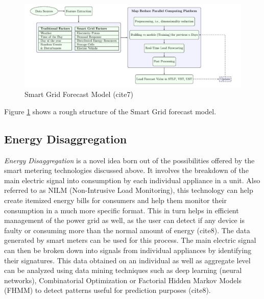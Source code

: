 \begin{figure}
	\includegraphics[width=\columnwidth]{images/sg_forecast.pdf}
	\caption{Smart Grid Forecast Model (cite7)}
	\label{F:forecast}
\end{figure}
Figure \ref{F:forecast} shows a rough structure of the Smart Grid forecast model.

\subsection{Energy Disaggregation}
{\em Energy Disaggregation} is a novel idea born out of the possibilities offered by the smart metering technologies discussed above. It involves the breakdown of the main electric signal into consumption by each individual appliance in a unit. Also referred to as NILM (Non-Intrusive Load Monitoring), this technology can help create itemized energy bills for consumers and help them monitor their consumption in a much more specific format. This in turn helps in efficient management of the power grid as well, as the user can detect if any device is faulty or consuming more than the normal amount of energy (cite8). The data generated by smart meters can be used for this process. The main electric signal can then be broken down into signals from individual appliances by identifying their signatures. This data obtained on an individual as well as aggregate level can be analyzed using data mining techniques such as deep learning (neural networks), Combinatorial Optimization or Factorial Hidden Markov Models (FHMM) to detect patterns useful for prediction purposes (cite8).

